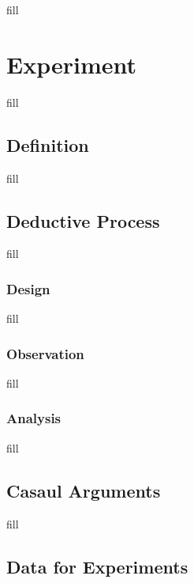 \documentclass[
  b5paper]{book}
\begin{document}
fill

\hypertarget{experiment-1}{%
\chapter{Experiment}\label{experiment-1}}

fill

\hypertarget{definition-1}{%
\section{Definition}\label{definition-1}}

fill

\hypertarget{deductive-process}{%
\section{Deductive Process}\label{deductive-process}}

fill

\hypertarget{design}{%
\subsection*{Design}\label{design}}

fill

\hypertarget{observation}{%
\subsection*{Observation}\label{observation}}

fill

\hypertarget{analysis}{%
\subsection*{Analysis}\label{analysis}}

fill

\hypertarget{casaul-arguments}{%
\section{Casaul Arguments}\label{casaul-arguments}}

fill

\hypertarget{data-for-experiments}{%
\section{Data for Experiments}\label{data-for-experiments}}
\end{document}
